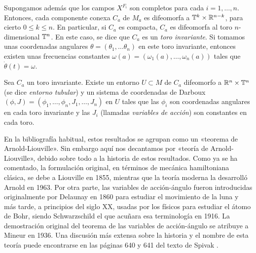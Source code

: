 \begin{thm}[Arnold]
  Supongamos además que los campos $X^{F_i}$ son completos para cada $i=1,\dots,n$. Entonces, cada componente conexa $C_a$ de $M_a$ es difeomorfa a $\mathbb{T}^k\times \mathbb{R}^{n-k}$, para cierto $0 \leq k \leq n$. En particular, si $C_a$ es compacta, $C_a$ es difeomorfa al toro $n$-dimensional $\mathbb{T}^n$. En este caso, se dice que $C_a$ es un \emph{toro invariante}. Si tomamos unas coordenadas angulares $\theta=(\theta_1,\dots\theta_n)$ en este toro invariante, entonces existen unas frecuencias constantes $\omega(a)=(\omega_1(a),\dots,\omega_n(a))$ tales que $\dot \theta (t)=\omega$.
\end{thm}

\begin{thm}
  Sea $C_a$ un toro invariante. Existe un entorno $U\subset M$ de $C_a$ difeomorfo a $\mathbb{R}^n \times \mathbb{T}^n$ (se dice \emph{entorno tubular}) y un sistema de coordenadas de Darboux $(\phi,J)=(\phi_1,\dots,\phi_n,J_1,\dots,J_n)$ en $U$ tales que las $\phi_i$ son coordenadas angulares en cada toro invariante y las $J_i$ (llamadas \emph{variables de acción}) son constantes en cada toro.
\end{thm}

En la bibliografía habitual, estos resultados se agrupan como un «teorema de Arnold-Liouville». Sin embargo aquí nos decantamos por «teoría de Arnold-Liouville», debido sobre todo a la historia de estos resultados.
Como ya se ha comentado, la formulación original, en términos de mecánica hamiltoniana clásica, se debe a Liouville en 1855, mientras que la teoría moderna la desarrolló Arnold en 1963. Por otra parte, las variables de acción-ángulo fueron introducidas originalmente por Delaunay en 1860 para estudiar el movimiento de la luna y más tarde, a principios del siglo XX, usadas por los físicos para estudiar el átomo de Bohr, siendo Schwarzschild el que acuñara esa terminología en 1916. La demostración original del teorema de las variables de acción-ángulo se atribuye a Mineur en 1936. 
 Una discusión más extensa sobre la historia y el nombre de esta teoría puede encontrarse en las páginas 640 y 641 del texto de Spivak \cite{spivak}.


